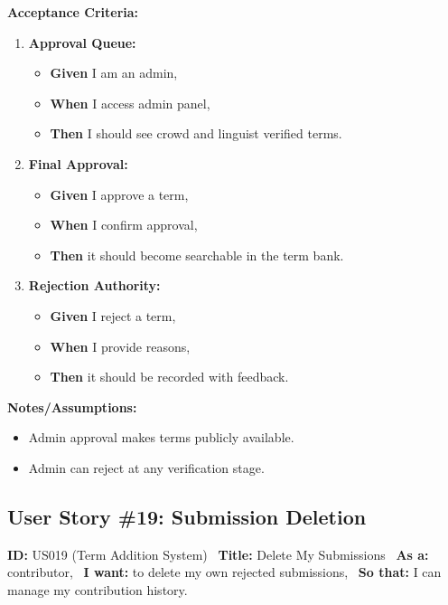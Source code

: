 \documentclass[12pt]{article}
\begin{document}
\vspace{1em}
\textbf{Acceptance Criteria:}
\begin{enumerate}
\item \textbf{Approval Queue:}
\begin{itemize}
\item \textbf{Given} I am an admin,
\item \textbf{When} I access admin panel,
\item \textbf{Then} I should see crowd and linguist verified terms.
\end{itemize}

\item \textbf{Final Approval:}
\begin{itemize}
    \item \textbf{Given} I approve a term,
    \item \textbf{When} I confirm approval,
    \item \textbf{Then} it should become searchable in the term bank.
\end{itemize}

\item \textbf{Rejection Authority:}
\begin{itemize}
    \item \textbf{Given} I reject a term,
    \item \textbf{When} I provide reasons,
    \item \textbf{Then} it should be recorded with feedback.
\end{itemize}
\end{enumerate}

\vspace{1em}
\textbf{Notes/Assumptions:}
\begin{itemize}
\item Admin approval makes terms publicly available.
\item Admin can reject at any verification stage.
\end{itemize}

\subsection{User Story \#19: Submission Deletion}
\textbf{ID:} US019 (Term Addition System) \
\textbf{Title:} Delete My Submissions \
\textbf{As a:} contributor, \
\textbf{I want:} to delete my own rejected submissions, \
\textbf{So that:} I can manage my contribution history.
\end{document}

